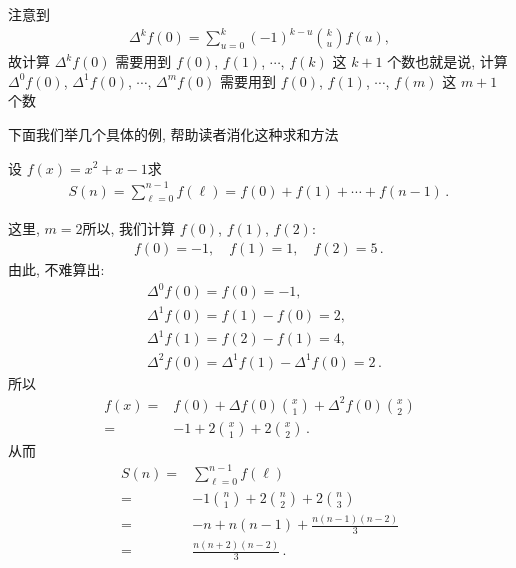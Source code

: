 注意到
\begin{align*}
    \Delta^k f(0) = \sum_{u = 0}^{k} (-1)^{k-u} \binom{k}{u} f(u),
\end{align*}
故计算 $\Delta^k f(0)$ 需要用到 $f(0)$, $f(1)$, $\cdots$, $f(k)$ 这 $k+1$ 个数\period 也就是说, 计算 $\Delta^0 f(0)$, $\Delta^1 f(0)$, $\cdots$, $\Delta^m f(0)$ 需要用到 $f(0)$, $f(1)$, $\cdots$, $f(m)$ 这 $m+1$ 个数\period

下面我们举几个具体的例, 帮助读者消化这种求和方法\period

\begin{example}
    设 $f(x) = x^2 + x - 1$\period 求
    \begin{align*}
        S(n) = \sum_{\ell = 0}^{n - 1} f(\ell) = f(0) + f(1) + \cdots + f(n - 1) \period
    \end{align*}

    这里, $m = 2$\period 所以, 我们计算 $f(0)$, $f(1)$, $f(2)$:
    \begin{align*}
        f(0) = -1, \quad f(1) = 1, \quad f(2) = 5 \period
    \end{align*}
    由此, 不难算出:
    \begin{align*}
         & \Delta^0 f(0) = f(0) = -1,                                \\
         & \Delta^1 f(0) = f(1) - f(0) = 2,                          \\
         & \Delta^1 f(1) = f(2) - f(1) = 4,                          \\
         & \Delta^2 f(0) = \Delta^1 f(1) - \Delta^1 f(0) = 2 \period
    \end{align*}
    所以
    \begin{align*}
        f(x)
        = {} & f(0) + \Delta f(0) \binom{x}{1} + \Delta^2 f(0) \binom{x}{2} \\
        = {} & -1 + 2 \binom{x}{1} + 2 \binom{x}{2} \period
    \end{align*}
    从而
    \begin{align*}
        S(n)
        = {} & \sum_{\ell = 0}^{n - 1} f(\ell)                   \\
        = {} & -1 \binom{n}{1} + 2 \binom{n}{2} + 2 \binom{n}{3} \\
        = {} & -n + n(n-1) + \frac{n(n-1)(n-2)}{3}               \\
        = {} & \frac{n(n+2)(n-2)}{3} \period
    \end{align*}


\end{example}
